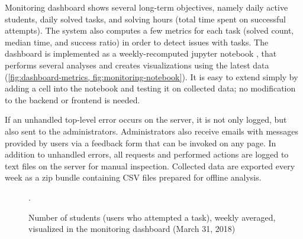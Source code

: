 Monitoring dashboard
  shows several long-term objectives, %
  namely daily active students, daily solved tasks, and
  solving hours (total time spent on successful attempts).
  The system also computes a few metrics for each task
  (solved count, median time, and success ratio) in order to detect
  issues with tasks. %
The dashboard is implemented as a weekly-recomputed jupyter notebook \cite{jupyter-notebooks},
  that performs several analyses
  and creates visualizations using the latest data
  (\cref{fig:dashboard-metrics, fig:monitoring-notebook}).
  It is easy to extend simply by adding
  a cell into the notebook and testing it on collected data;
  no modification to the backend or frontend is needed.

  If an unhandled top-level error occurs on the server,
  it is not only logged, but also sent to the administrators.
  Administrators also receive emails with messages provided by users via
  a feedback form that can be invoked on any page.
  In addition to unhandled errors, all requests and performed actions are
  logged to text files on the server for manual inspection.
  Collected data are exported every week as a zip bundle containing
  CSV files prepared for %
  offline analysis.

\begin{figure}[htb]
\centering
{}
\caption{%
  Number of students (users who attempted a task), weekly averaged, visualized
  in the monitoring dashboard (March 31, 2018)}.
\label{fig:dashboard-metrics}
\end{figure}

